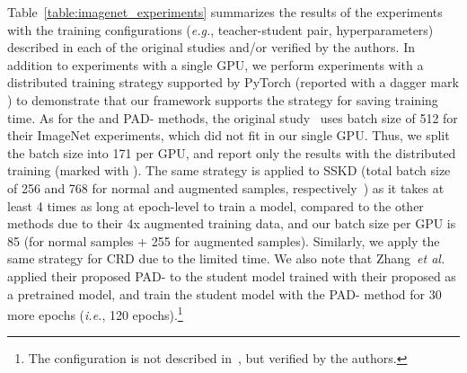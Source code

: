 \documentclass[runningheads]{llncs}
\begin{document}
Table~\ref{table:imagenet_experiments} summarizes the results of the experiments with the training configurations (\emph{e.g.}, teacher-student pair, hyperparameters) described in each of the original studies and/or verified by the authors.
In addition to experiments with a single GPU, we perform experiments with a distributed training strategy supported by PyTorch (reported with a dagger mark \textdagger) to demonstrate that our framework supports the strategy for saving training time.
As for the  and PAD- methods, the original study~\cite{zhang2020prime} uses batch size of 512 for their ImageNet experiments, which did not fit in our single GPU.
Thus, we split the batch size into 171 per GPU, and report only the results with the distributed training (marked with \textdaggerdbl).
The same strategy is applied to SSKD (total batch size of 256 and 768 for normal and augmented samples, respectively~\cite{xu2020knowledge}) as it takes at least 4 times as long at epoch-level to train a model, compared to the other methods due to their 4x augmented training data, and our batch size per GPU is 85 (for normal samples + 255 for augmented samples).
Similarly, we apply the same strategy for CRD due to the limited time.
We also note that Zhang~\emph{et al.}~\cite{zhang2020prime} applied their proposed PAD- to the student model trained with their proposed  as a pretrained model, and train the student model with the PAD- method for 30 more epochs (\emph{i.e.}, 120 epochs).\footnote{The configuration is not described in~\cite{zhang2020prime}, but verified by the authors.}
\end{document}
